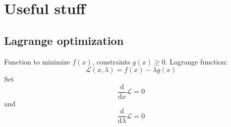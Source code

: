 \documentclass[a4paper]{scrartcl}
\begin{document}
\section{Useful stuff}

\subsection{Lagrange optimization}
Function to minimize $f(x)$, constraints $g(x)\ge 0$. Lagrange function:
\[\mathcal{L}(x,\lambda)=f(x)-\lambda g(x)\]
Set
\[\frac{\mathrm{d}}{\mathrm{d}x}\mathcal{L}=0\] and
\[\frac{\mathrm{d}}{\mathrm{d}\lambda}\mathcal{L}=0\]

\end{document}

